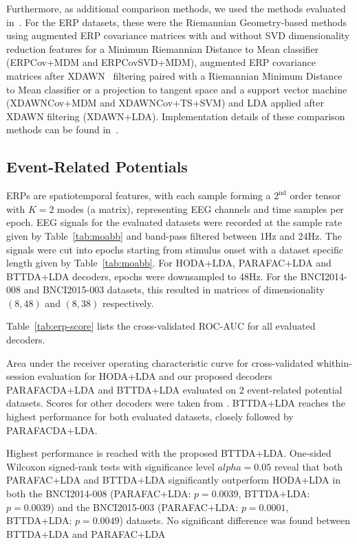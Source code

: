 \documentclass[twocolumn]{article}
\begin{document}
Furthermore, as additional comparison methods, we used the methods evaluated in~\cite{Chevallier2024}.
For the ERP datasets, these were the Riemannian Geometry-based methods
using augmented ERP covariance matrices with and without SVD dimensionality
reduction features for a Minimum Riemannian Distance to Mean classifier
(ERPCov+MDM and ERPCovSVD+MDM), augmented ERP covariance matrices after
XDAWN~\cite{Rivet2009}
filtering paired with a Riemannian Minimum Distance to Mean classifier or a
projection to tangent space and a support vector machine (XDAWNCov+MDM and
XDAWNCov+TS+SVM) and LDA applied after XDAWN filtering (XDAWN+LDA).
Implementation details of these comparison methods can be found
in~\cite{Chevallier2024}.

\subsection{Event-Related Potentials}
ERPs are spatiotemporal features, with each sample forming a $2^\text{nd}$
order tensor with $K=2$ modes (a matrix), representing EEG channels and time samples
per epoch.
EEG signals for the evaluated datasets were recorded at the sample rate given
by Table~\ref{tab:moabb} and band-pass filtered between 1Hz
and 24Hz.
The signals were cut into epochs starting from stimulus onset with a
dataset specific length given by Table~\ref{tab:moabb}.
For HODA+LDA, PARAFAC+LDA and BTTDA+LDA decoders, epochs were downsampled to 48Hz.
For the BNCI2014-008 and BNCI2015-003 datasets, this resulted in matrices of
dimensionality $(8,48)$ and $(8,38)$ respectively.

Table~\ref{tab:erp-score} lists the cross-validated ROC-AUC for all evaluated
decoders.
\begin{table}[t]
	\centering
	\footnotesize
	\centering
	
	\caption{Area under the receiver operating characteristic curve for
		cross-validated whithin-session evaluation for HODA+LDA and our proposed decoders
		PARAFACDA+LDA and BTTDA+LDA evaluated on 2 event-related potential datasets.
		Scores for other decoders were taken from \cite{Chevallier2024}.
		BTTDA+LDA reaches the highest performance for both evaluated datasets, closely
		followed by PARAFACDA+LDA.
	}
	\label{tab:erp-score}
\end{table}
Highest performance is reached with the proposed BTTDA+LDA.
One-sided Wilcoxon signed-rank tests with significance level $alpha=0.05$ reveal that both PARAFAC+LDA and BTTDA+LDA
significantly outperform HODA+LDA in both the BNCI2014-008 (PARAFAC+LDA:
$p=0.0039$, BTTDA+LDA: $p=0.0039$) and the BNCI2015-003 (PARAFAC+LDA:
$p=0.0001$, BTTDA+LDA: $p=0.0049$) datasets.
No significant difference was found between BTTDA+LDA and PARAFAC+LDA
\end{document}
